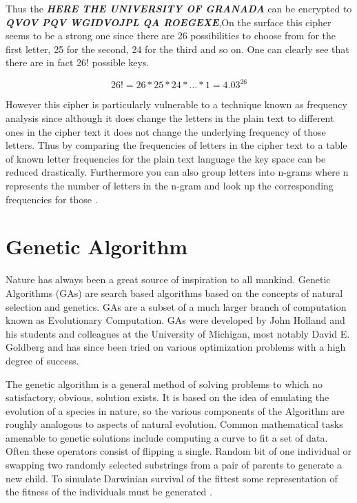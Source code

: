 Thus the \textit{\textbf{HERE THE UNIVERSITY OF GRANADA}} can be encrypted to \textit{\textbf{QVOV PQV WGIDVOJPL QA ROEGEXE}},On the surface this cipher seems to be a strong one since there are 26 possibilities to choose from for the
first letter, 25 for the second, 24 for the third and so on. One can clearly see that there are in fact 26!
possible keys. 

\begin{equation} 26!= 26 * 25 * 24 * … * 1 = 4.03^{26} \end{equation}

However this cipher is particularly vulnerable to a technique known as frequency analysis since although it
does change the letters in the plain text to different ones in the cipher text it does not change the
underlying frequency of those letters.
Thus by comparing the frequencies of letters in the cipher text to a table of known letter frequencies for
the plain text language the key space can be reduced drastically. Furthermore you can also group letters
into n-grams where n represents the number of letters in the n-gram and look up the corresponding
frequencies for those \cite{brownbridge2007decrypting}. 
\newpage
\section{Genetic Algorithm}
Nature has always been a great source of inspiration to all mankind. Genetic Algorithms (GAs) are search based algorithms based on the concepts of natural selection and genetics. GAs are a subset of a much larger branch of computation known as Evolutionary Computation\cite{GAs}.
GAs were developed by John Holland and his students and colleagues at the University of Michigan, most notably David E. Goldberg and has since been tried on various optimization problems with a high degree of success\cite{GAs}.

The genetic algorithm is a general method of solving problems to
which no satisfactory, obvious, solution exists. It is based on the idea of
emulating the evolution of a species in nature, so the various components
of the Algorithm are roughly analogous to aspects of natural evolution.
Common mathematical tasks amenable to genetic solutions include
computing a curve to fit a set of data. Often these operators consist of
flipping a single.
Random bit of one individual or swapping two randomly selected
substrings from a pair of parents to generate a new child. To simulate
Darwinian survival of the fittest some representation of the fitness of the
individuals must be generated \cite{toemeh2007breaking}.

